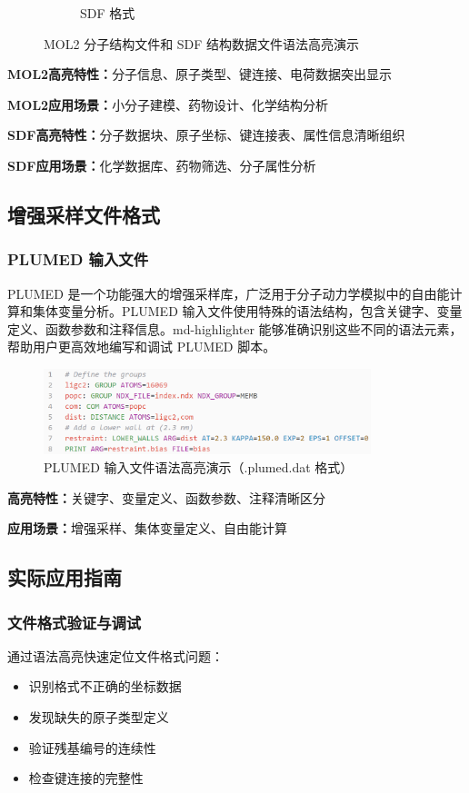 \begin{figure}[!h]
\begin{subfigure}[c]{0.49\textwidth}
        \caption{SDF 格式}
        \label{fig:sdf-highlighting}
    \end{subfigure}
    \caption{MOL2 分子结构文件和 SDF 结构数据文件语法高亮演示}
    \label{fig:mol2-sdf-highlighting}
\end{figure}

\textbf{MOL2高亮特性：}分子信息、原子类型、键连接、电荷数据突出显示

\textbf{MOL2应用场景：}小分子建模、药物设计、化学结构分析

\textbf{SDF高亮特性：}分子数据块、原子坐标、键连接表、属性信息清晰组织

\textbf{SDF应用场景：}化学数据库、药物筛选、分子属性分析

\subsection{增强采样文件格式}

\subsubsection{PLUMED 输入文件}

PLUMED 是一个功能强大的增强采样库，广泛用于分子动力学模拟中的自由能计算和集体变量分析。PLUMED 输入文件使用特殊的语法结构，包含关键字、变量定义、函数参数和注释信息。md-highlighter 能够准确识别这些不同的语法元素，帮助用户更高效地编写和调试 PLUMED 脚本。

\begin{figure}[!h]
    \centering
    \includegraphics[width=0.85\textwidth]{../images/plumed.png}
    \caption{PLUMED 输入文件语法高亮演示（.plumed.dat 格式）}
    \label{fig:plumed-highlighting}
\end{figure}

\textbf{高亮特性：}关键字、变量定义、函数参数、注释清晰区分

\textbf{应用场景：}增强采样、集体变量定义、自由能计算

\subsection{实际应用指南}

\subsubsection{文件格式验证与调试}
通过语法高亮快速定位文件格式问题：
\begin{itemize}
    \item 识别格式不正确的坐标数据
    \item 发现缺失的原子类型定义
    \item 验证残基编号的连续性
    \item 检查键连接的完整性
\end{itemize}

